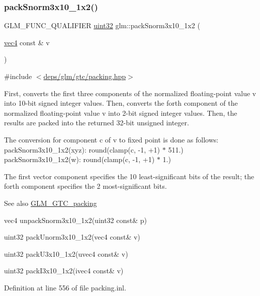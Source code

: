 \subsubsection{\texorpdfstring{pack\+Snorm3x10\+\_\+1x2()}{packSnorm3x10\_1x2()}}
{\footnotesize\ttfamily G\+L\+M\+\_\+\+F\+U\+N\+C\+\_\+\+Q\+U\+A\+L\+I\+F\+I\+ER \hyperlink{group__gtc__type__precision_ga202b6a53c105fcb7e531f9b443518451}{uint32} glm\+::pack\+Snorm3x10\+\_\+1x2 (\begin{DoxyParamCaption}\item[{\hyperlink{group__core__types_ga5881b1b022d7fd1b7218f5916532dd02}{vec4} const \&}]{v }\end{DoxyParamCaption})}



{\ttfamily \#include $<$\hyperlink{gtc_2packing_8hpp}{deps/glm/gtc/packing.\+hpp}$>$}

First, converts the first three components of the normalized floating-\/point value v into 10-\/bit signed integer values. Then, converts the forth component of the normalized floating-\/point value v into 2-\/bit signed integer values. Then, the results are packed into the returned 32-\/bit unsigned integer.

The conversion for component c of v to fixed point is done as follows\+: pack\+Snorm3x10\+\_\+1x2(xyz)\+: round(clamp(c, -\/1, +1) $\ast$ 511.) pack\+Snorm3x10\+\_\+1x2(w)\+: round(clamp(c, -\/1, +1) $\ast$ 1.)

The first vector component specifies the 10 least-\/significant bits of the result; the forth component specifies the 2 most-\/significant bits.

\begin{DoxySeeAlso}{See also}
\hyperlink{group__gtc__packing}{G\+L\+M\+\_\+\+G\+T\+C\+\_\+packing} 

vec4 unpack\+Snorm3x10\+\_\+1x2(uint32 const\& p) 

uint32 pack\+Unorm3x10\+\_\+1x2(vec4 const\& v) 

uint32 pack\+U3x10\+\_\+1x2(uvec4 const\& v) 

uint32 pack\+I3x10\+\_\+1x2(ivec4 const\& v) 
\end{DoxySeeAlso}


Definition at line 556 of file packing.\+inl.

\mbox{\label{group__gtc__packing_ga9b237d7c66b7a71964e6d1f4dc06539f}} 
